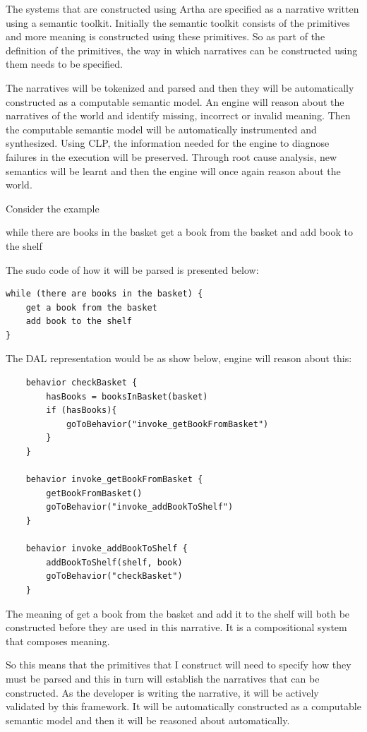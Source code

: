 The systems that are constructed using Artha are specified as a narrative written using a semantic toolkit. Initially the semantic toolkit consists of the primitives and more meaning is constructed using these primitives. So as part of the definition of the primitives, the way in which narratives can be constructed using them needs to be specified.

The narratives will be tokenized and parsed and then they will be automatically constructed as a computable semantic model. An engine will reason about the narratives of the world and identify missing, incorrect or invalid meaning. Then the computable semantic model will be automatically instrumented and synthesized. Using CLP, the information needed for the engine to diagnose failures in the execution will be preserved. Through root cause analysis, new semantics will be learnt and then the engine will once again reason about the world.

Consider the example

\begin{greyquote}
while there are books in the basket get a book from the basket and add book to the shelf
\end{greyquote}

The sudo code of how it will be parsed is presented below:

\begin{verbatim}
while (there are books in the basket) {
    get a book from the basket
    add book to the shelf
}
\end{verbatim}

The DAL representation would be as show below, engine will reason about this:

\begin{verbatim}
    behavior checkBasket {
        hasBooks = booksInBasket(basket)
        if (hasBooks){
            goToBehavior("invoke_getBookFromBasket")
        }
    }

    behavior invoke_getBookFromBasket {
        getBookFromBasket()
        goToBehavior("invoke_addBookToShelf")
    }

    behavior invoke_addBookToShelf {
        addBookToShelf(shelf, book)
        goToBehavior("checkBasket")
    }
\end{verbatim}

The meaning of get a book from the basket and add it to the shelf will both be constructed before they are used in this narrative. It is a compositional system that composes meaning.

So this means that the primitives that I construct will need to specify how they must be parsed and this in turn will establish the narratives that can be constructed. As the developer is writing the narrative, it will be actively validated by this framework. It will be automatically constructed as a computable semantic model and then it will be reasoned about automatically.

